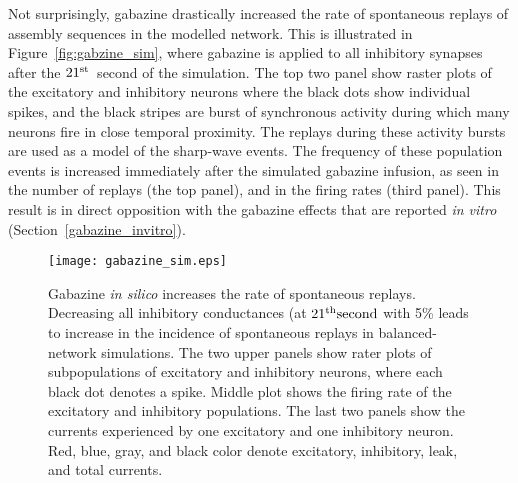     Not surprisingly, gabazine drastically increased the rate of spontaneous
    replays of assembly sequences in the modelled network. This is illustrated
    in Figure~\ref{fig:gabzine_sim}, where gabazine is applied to all inhibitory
    synapses after the $21^{\rm st}$~second of the simulation. The top two
    panel show raster plots of the excitatory and inhibitory neurons where the
    black dots show individual spikes, and the black stripes are burst of
    synchronous activity during which many neurons fire in close temporal
    proximity. The replays during these activity bursts are used as a model of
    the sharp-wave events. The frequency of these population events is
    increased immediately after the simulated gabazine infusion, as seen in the number of
    replays (the top panel), and in the firing rates (third panel). This result
    is in direct opposition with the gabazine effects that are reported
    {\textit{in vitro}} (Section~\ref{gabazine_invitro}).

    \begin{figure}
      \texttt{[image: gabazine\_sim.eps]}
      \caption{
        Gabazine {\it in silico} increases the rate of spontaneous replays.
        Decreasing all inhibitory conductances (at $21^{\rm th} \rm second$
        with 5\% leads to increase in the incidence of spontaneous replays in
        balanced-network simulations. The two upper panels show rater plots of
        subpopulations of excitatory and inhibitory neurons, where each black
        dot denotes a spike. Middle plot shows the firing rate of the
        excitatory and inhibitory populations. The last two panels show the
        currents experienced by one excitatory and one inhibitory neuron. Red,
        blue, gray, and black color denote excitatory, inhibitory, leak, and
        total currents.
            }
    \label{fig:gabazine_sim}
    \end{figure}

